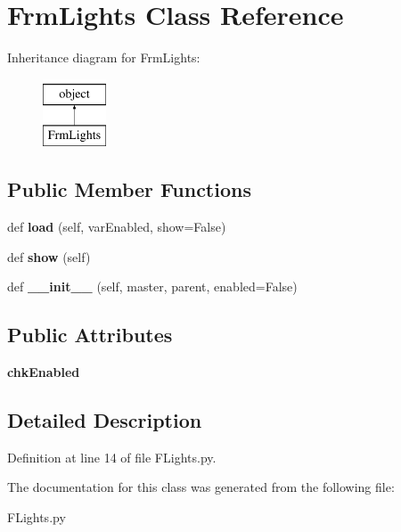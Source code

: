 \hypertarget{class_f_lights_1_1_frm_lights}{}\section{Frm\+Lights Class Reference}
\label{class_f_lights_1_1_frm_lights}
Inheritance diagram for Frm\+Lights\+:\begin{figure}[H]
\begin{center}
\leavevmode
\includegraphics[height=2.000000cm]{class_f_lights_1_1_frm_lights}
\end{center}
\end{figure}
\subsection*{Public Member Functions}
\begin{DoxyCompactItemize}
\item 
\mbox{\label{class_f_lights_1_1_frm_lights_a38f4c0a1b0b9f14e89e7670d417e140a}} 
def {\bfseries load} (self, var\+Enabled, show=False)
\item 
\mbox{\label{class_f_lights_1_1_frm_lights_ab4f4398c3f210fe4ea6e720401357691}} 
def {\bfseries show} (self)
\item 
\mbox{\label{class_f_lights_1_1_frm_lights_adffadd9833af4759460d71b7d00bbf4c}} 
def {\bfseries \+\_\+\+\_\+init\+\_\+\+\_\+} (self, master, parent, enabled=False)
\end{DoxyCompactItemize}
\subsection*{Public Attributes}
\begin{DoxyCompactItemize}
\item 
\mbox{\label{class_f_lights_1_1_frm_lights_aa5ba96b8972782a03e3d83def0f965a9}} 
{\bfseries chk\+Enabled}
\end{DoxyCompactItemize}


\subsection{Detailed Description}


Definition at line 14 of file F\+Lights.\+py.



The documentation for this class was generated from the following file\+:\begin{DoxyCompactItemize}
\item 
F\+Lights.\+py\end{DoxyCompactItemize}

